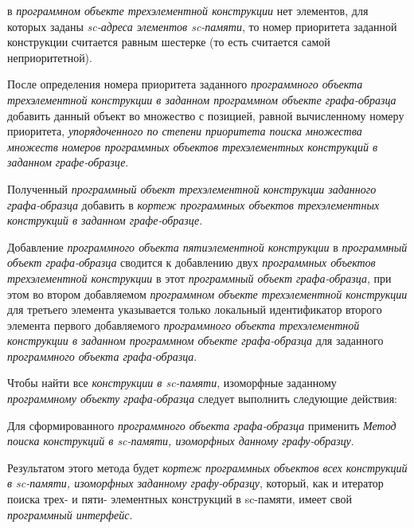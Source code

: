 \begin{textitemize}
\begin{textitemize}
		\item {} в \textit{программном объекте трехэлементной конструкции} нет элементов, для которых заданы \textit{sc-адреса элементов sc-памяти}, то номер приоритета заданной конструкции считается равным шестерке (то есть считается самой неприоритетной).
	\end{textitemize}
	После определения номера приоритета заданного \textit{программного объекта трехэлементной конструкции в заданном программном объекте графа-образца} добавить данный объект во множество с позицией, равной вычисленному номеру приоритета, \textit{упорядоченного по степени приоритета поиска множества множеств номеров программных объектов трехэлементных конструкций в заданном графе-образце}.
	\item Полученный \textit{программный объект трехэлементной конструкции заданного графа-образца} добавить в \textit{кортеж программных объектов трехэлементных конструкций в заданном графе-образце}.
\end{textitemize}

Добавление \textit{программного объекта пятиэлементной конструкции} в \textit{программный объект графа-образца} сводится к добавлению двух \textit{программных объектов трехэлементной конструкции} в этот \textit{программный объект графа-образца}, при этом во втором добавляемом \textit{программном объекте трехэлементной конструкции} для третьего элемента указывается только локальный идентификатор второго элемента первого добавляемого \textit{программного объекта трехэлементной конструкции в заданном программном объекте графа-образца} для заданного \textit{программного объекта графа-образца}.

Чтобы найти все \textit{конструкции в sc-памяти}, изоморфные заданному \textit{программному объекту графа-образца} следует выполнить следующие действия:
\begin{textitemize}
	\item Для сформированного \textit{программного объекта графа-образца} применить \textit{Метод поиска конструкций в sc-памяти, изоморфных данному графу-образцу}.
	\item Результатом этого метода будет \textit{кортеж программных объектов всех конструкций в sc-памяти, изоморфных заданному графу-образцу}, который, как и итератор поиска трех- и пяти- элементных конструкций в sc-памяти, имеет свой \textit{программный интерфейс}.
\end{textitemize}

